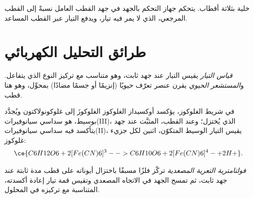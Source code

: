 \begin{omfigure}

{\small خلية بثلاثة أقطاب. يتحكم جهاز التحكم بالجهد في جهد
القطب العامل نسبةً إلى القطب المرجعي، الذي لا يمر فيه تيار،
ويدفع التيار عبر القطب المساعد.}
\end{omfigure}

\section{طرائق التحليل الكهربائي}

\begin{definition}\label{def:b3:electrode-kinetics:amperometry}
\emph{قياس التيار} يقيس التيار عند جهد ثابت،
وهو متناسب مع تركيز النوع الذي يتفاعل. 
و\emph{المستشعر الحيوي} يقرن عنصر تعرّف حيويًا (إنزيمًا
أو جسمًا مضادًا) بمحوِّل، وهو هنا قطب.
\end{definition}

في شريط الغلوكوز، يؤكسد  أوكسيداز الغلوكوز الغلوكوزَ إلى غلوكونولاكتون 
ويُجدَّد بوسيط، هو سداسي سيانوفيرات(III)، الذي يُختزل؛ وعند
القطب، المثبَّت عند جهد يتأكسد فيه سداسي سيانوفيرات(II)، يقيس
التيار الوسيط المتكوّن، اثنين لكل جزيء غلوكوز:
\[
  \ce{C6H12O6 + 2 [Fe(CN)6]^3- -> C6H10O6 + 2 [Fe(CN)6]^4- + 2 H+} .
\]

\begin{definition}\label{def:b3:electrode-kinetics:stripping}
\emph{فولتامترية التعرية المصعدية}
تركّز فلزًا مسبقًا باختزال أيوناته على قطب مدة ثابتة
عند جهد ثابت، ثم تمسح الجهد في الاتجاه المصعدي وتقيس
قمة تيار إعادة أكسدته، المتناسبة مع تركيزه
في المحلول.
\end{definition}


